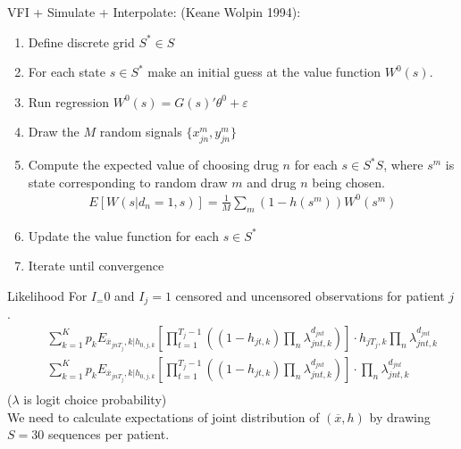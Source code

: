 \begin{frame}{VFI + Simulate + Interpolate: (Keane Wolpin 1994): }
\begin{enumerate}
\item Define discrete grid $S^* \in S$
\item For each state $s \in S^*$ make an initial guess at the value function $W^0(s)$.
\item Run regression $W^0(s) = G(s)'\theta^0 + \varepsilon$
\item Draw the $M$ random signals $\{x_{jn}^m, y_{jn}^m\}$
\item Compute the expected value of choosing drug $n$ for each $s \in S^*S$, where $s^m$ is state corresponding to random draw $m$ and drug $n$ being chosen.
\begin{eqnarray*}
E[W(s | d_n =1,s)] = \frac{1}{M} \sum_m (1-h(s^m)) W^0(s^m)
\end{eqnarray*}
\item Update the value function for each $s \in S^{*}$
\item Iterate until convergence
\end{enumerate}
\end{frame}

\begin{frame}{Likelihood}
For $I_=0$ and $I_j=1$ censored and uncensored observations for patient $j$.
\begin{eqnarray*}
&&\sum_{k=1}^K p_k E_{\overline{x}_{jn T_{j}},k | h_{0,j,k}} \left[ \prod_{t=1}^{T_j-1} \left((1-h_{jt,k}) \prod_n \lambda_{jnt,k}^{d_{jnt}} \right) \right] \cdot h_{jT_j,k} \prod_n  \lambda_{jnt,k}^{d_{jnt}}\\
&&\sum_{k=1}^K p_k E_{\overline{x}_{jn T_{j}},k | h_{0,j,k}} \left[ \prod_{t=1}^{T_j-1} \left((1-h_{jt,k}) \prod_n \lambda_{jnt,k}^{d_{jnt}} \right) \right] \cdot \prod_n  \lambda_{jnt,k}^{d_{jnt}}\\
\end{eqnarray*}
($\lambda$ is logit choice probability)\\
We need to calculate expectations of joint distribution of $(\overline{x},h)$ by drawing $S=30$ sequences  per patient.
\end{frame}


